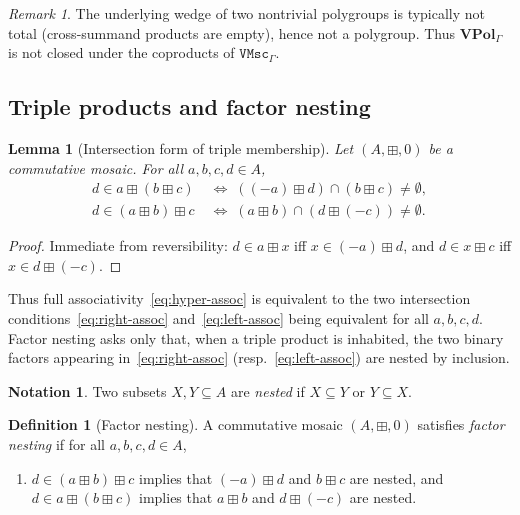 \documentclass[11pt]{amsart}
\theoremstyle{plain}
\newtheorem{lemma}[theorem]{Lemma}
\theoremstyle{definition}
\newtheorem{definition}[theorem]{Definition}
\newtheorem*{notation}{Notation}
\theoremstyle{remark}
\newtheorem{remark}[theorem]{Remark}
\newcommand{\VMscG}{\mathtt{VMsc}_{\Gamma}}
\begin{document}
\begin{remark}
\label{rem:VPol-coprod}
The underlying wedge of two nontrivial polygroups is typically not total (cross-summand products are empty), hence not a polygroup. Thus \(\mathbf{VPol}_\Gamma\) is not closed under the coproducts of \(\VMscG\).
\end{remark}

\subsection{Triple products and factor nesting}

\begin{lemma}[Intersection form of triple membership]
\label{lem:triple-inter}
Let \((A,\boxplus,0)\) be a commutative mosaic. For all \(a,b,c,d\in A\),
\begin{align}
d\in a\boxplus(b\boxplus c)
&\;\iff\;
((-a)\boxplus d)\cap(b\boxplus c)\neq\emptyset,
\label{eq:right-assoc}\\
d\in(a\boxplus b)\boxplus c
&\;\iff\;
(a\boxplus b)\cap(d\boxplus(-c))\neq\emptyset.
\label{eq:left-assoc}
\end{align}
\end{lemma}

\begin{proof}
Immediate from reversibility: \(d\in a\boxplus x\) iff \(x\in(-a)\boxplus d\), and \(d\in x\boxplus c\) iff \(x\in d\boxplus(-c)\).
\end{proof}

Thus full associativity~\eqref{eq:hyper-assoc} is equivalent to the two intersection conditions~\eqref{eq:right-assoc} and~\eqref{eq:left-assoc} being equivalent for all \(a,b,c,d\). Factor nesting asks only that, when a triple product is inhabited, the two binary factors appearing in~\eqref{eq:right-assoc} (resp.~\eqref{eq:left-assoc}) are nested by inclusion.

\begin{notation}
Two subsets \(X,Y\subseteq A\) are \emph{nested} if \(X\subseteq Y\) or \(Y\subseteq X\).
\end{notation}

\begin{definition}[Factor nesting]
\label{def:fn}
A commutative mosaic \((A,\boxplus,0)\) satisfies \emph{factor nesting} if for all \(a,b,c,d\in A\),
\begin{enumerate}[label=(FN)]
\item\label{fn}
\(d\in(a\boxplus b)\boxplus c\) implies that \((-a)\boxplus d\) and \(b\boxplus c\) are nested, and\\
\(d\in a\boxplus(b\boxplus c)\) implies that \(a\boxplus b\) and \(d\boxplus(-c)\) are nested.
\end{enumerate}
\end{definition}
\end{document}
